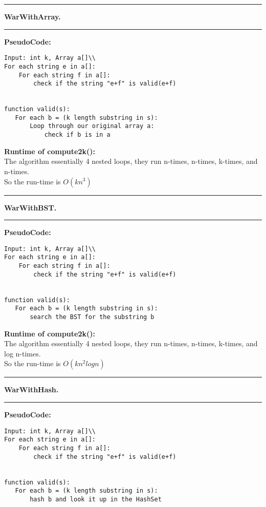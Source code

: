 \documentclass[11pt]{article}
\newcommand\question[2]{\vspace{.25in}\hrule\textbf{#1. #2}\vspace{.5em}\hrule\vspace{.10in}}
\begin{document}
\raggedright
\newcommand\NAME{Devin Johnson, Mason Wray}  %
\newcommand\HWNUM{ PA1}              %



\question{WarWithArray}{} 

\textbf{PseudoCode:}\\
\begin{verbatim}
Input: int k, Array a[]\\
For each string e in a[]:
    For each string f in a[]:
        check if the string "e+f" is valid(e+f)
    	
    	
function valid(s):
   For each b = (k length substring in s):
       Loop through our original array a:
           check if b is in a
\end{verbatim}

\textbf{Runtime of compute2k():}\\

The algorithm essentially 4 nested loops, they run n-times, n-times, k-times, and n-times.\\
So the run-time is $O(kn^3)$


\question{WarWithBST}{}

\textbf{PseudoCode:}\\

\begin{verbatim}
Input: int k, Array a[]\\
For each string e in a[]:
    For each string f in a[]:
        check if the string "e+f" is valid(e+f)
    	
    	
function valid(s):
   For each b = (k length substring in s):
       search the BST for the substring b
\end{verbatim}


\textbf{Runtime of compute2k():}\\
The algorithm essentially 4 nested loops, they run n-times, n-times, k-times, and log n-times.\\
So the run-time is $O(kn^2logn)$

\pagebreak
\question{WarWithHash}{}

\textbf{PseudoCode:}\\
\begin{verbatim}
Input: int k, Array a[]\\
For each string e in a[]:
    For each string f in a[]:
        check if the string "e+f" is valid(e+f)
    	
    	
function valid(s):
   For each b = (k length substring in s):
       hash b and look it up in the HashSet
\end{verbatim}
\end{document}
